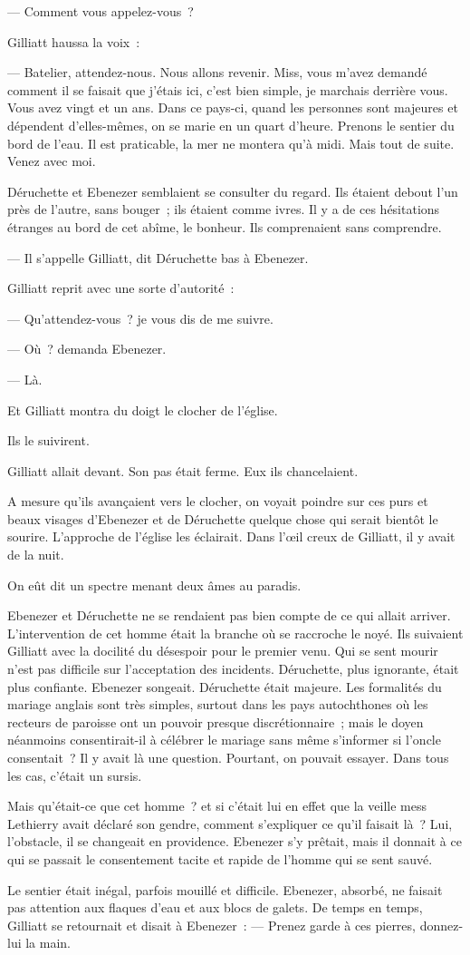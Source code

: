 \documentclass[french,twoside]{book} %
\begin{document}
— Comment vous appelez-vous ?\par
Gilliatt haussa la voix :\par
— Batelier, attendez-nous. Nous allons revenir. Miss, vous m’avez demandé comment il se faisait que  j’étais ici, c’est bien simple, je marchais derrière vous. Vous avez vingt et un ans. Dans ce pays-ci, quand les personnes sont majeures et dépendent d’elles-mêmes, on se marie en un quart d’heure. Prenons le sentier du bord de l’eau. Il est praticable, la mer ne montera qu’à midi. Mais tout de suite. Venez avec moi.\par
Déruchette et Ebenezer semblaient se consulter du regard. Ils étaient debout l’un près de l’autre, sans bouger ; ils étaient comme ivres. Il y a de ces hésitations étranges au bord de cet abîme, le bonheur. Ils comprenaient sans comprendre.\par
— Il s’appelle Gilliatt, dit Déruchette bas à Ebenezer.\par
Gilliatt reprit avec une sorte d’autorité :\par
— Qu’attendez-vous ? je vous dis de me suivre.\par
— Où ? demanda Ebenezer.\par
— Là.\par
Et Gilliatt montra du doigt le clocher de l’église.\par
Ils le suivirent.\par
Gilliatt allait devant. Son pas était ferme. Eux ils chancelaient.\par
A mesure qu’ils avançaient vers le clocher, on voyait poindre sur ces purs et beaux visages d’Ebenezer et de Déruchette quelque chose qui serait bientôt le sourire. L’approche de l’église les éclairait. Dans l’œil creux de Gilliatt, il y avait de la nuit.\par
On eût dit un spectre menant deux âmes au paradis.\par
Ebenezer et Déruchette ne se rendaient pas bien compte de ce qui allait arriver. L’intervention de cet homme était la branche où se raccroche le noyé. Ils  suivaient Gilliatt avec la docilité du désespoir pour le premier venu. Qui se sent mourir n’est pas difficile sur l’acceptation des incidents. Déruchette, plus ignorante, était plus confiante. Ebenezer songeait. Déruchette était majeure. Les formalités du mariage anglais sont très simples, surtout dans les pays autochthones où les recteurs de paroisse ont un pouvoir presque discrétionnaire ; mais le doyen néanmoins consentirait-il à célébrer le mariage sans même s’informer si l’oncle consentait ? Il y avait là une question. Pourtant, on pouvait essayer. Dans tous les cas, c’était un sursis.\par
Mais qu’était-ce que cet homme ? et si c’était lui en effet que la veille mess Lethierry avait déclaré son gendre, comment s’expliquer ce qu’il faisait là ? Lui, l’obstacle, il se changeait en providence. Ebenezer s’y prêtait, mais il donnait à ce qui se passait le consentement tacite et rapide de l’homme qui se sent sauvé.\par
Le sentier était inégal, parfois mouillé et difficile. Ebenezer, absorbé, ne faisait pas attention aux flaques d’eau et aux blocs de galets. De temps en temps, Gilliatt se retournait et disait à Ebenezer : — Prenez garde à ces pierres, donnez-lui la main.
\end{document}
